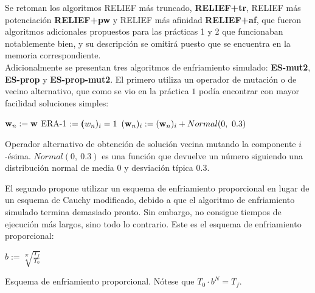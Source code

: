 \documentclass{article}
\newenvironment{algo}{
	\vspace*{0.5cm}
	\begin{algorithm}[H]}{
	\end{algorithm}
	\vspace*{0.5cm}
}
\begin{document}
Se retoman los algoritmos RELIEF más truncado, \textbf{RELIEF+tr}, RELIEF más potenciación \textbf{RELIEF+pw} y RELIEF más afinidad \textbf{RELIEF+af}, que fueron algoritmos adicionales propuestos para las prácticas 1 y 2 que funcionaban notablemente bien, y su descripción se omitirá puesto que se encuentra en la memoria correspondiente. \\

Adicionalmente se presentan tres algoritmos de enfriamiento simulado: \textbf{ES-mut2}, \textbf{ES-prop} y \textbf{ES-prop-mut2}. El primero utiliza un operador de mutación o de vecino alternativo, que como se vio en la práctica $1$ podía encontrar con mayor facilidad soluciones simples:

\begin{algo}
	$\normalfont \textbf w_n := \normalfont \textbf w$\;
	ERA-1 $:= \normalfont \textbf (w_n)_i = 1$\;
	$(\normalfont \textbf w_n)_i := (\normalfont \textbf w_n)_i + Normal(0,\ 0.3)$\;
	\vspace{0.2cm}
	\caption{Operador alternativo de obtención de solución vecina mutando la componente $i$-ésima. $Normal(0,\ 0.3)$ es una función que devuelve un número siguiendo una distribución normal de media $0$ y desviación típica $0.3$.}
\end{algo}

El segundo propone utilizar un esquema de enfriamiento proporcional en lugar de un esquema de Cauchy modificado, debido a que el algoritmo de enfriamiento simulado termina demasiado pronto. Sin embargo, no consigue tiempos de ejecución más largos, sino todo lo contrario. Este es el esquema de enfriamiento proporcional:

\begin{algo}
	\BlankLine
	$b := \sqrt[N]{\frac{T_f}{T_0}}$\;
	\vspace{0.2cm}
	\caption{Esquema de enfriamiento proporcional. Nótese que $T_0 \cdot b^N = T_f$.}
\end{algo}
\end{document}
